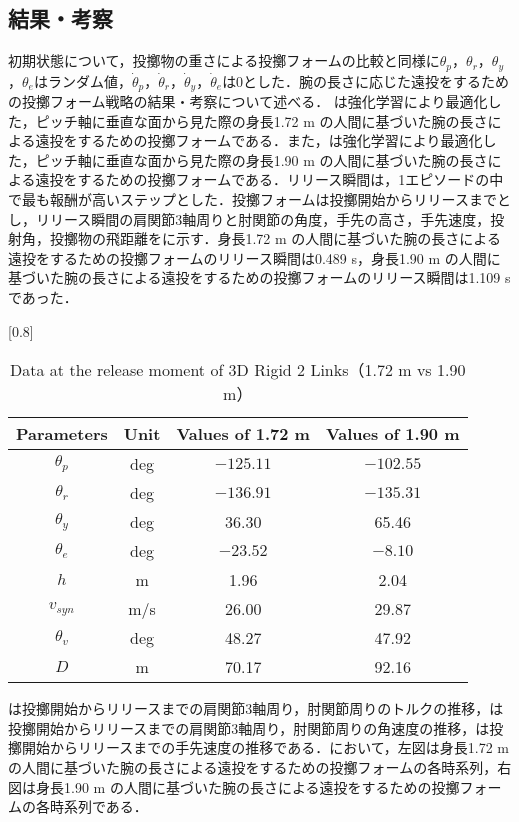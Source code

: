 \begin{small}
\subsection{結果・考察}
初期状態について，投擲物の重さによる投擲フォームの比較と同様に$\theta_{p}$，$\theta_{r}$，$\theta_{y}$，$\theta_{e}$はランダム値，$\dot{\theta}_{p}$，$\dot{\theta}_{r}$，$\dot{\theta}_{y}$，$\dot{\theta}_{e}$は0とした．腕の長さに応じた遠投をするための投擲フォーム戦略の結果・考察について述べる．
は強化学習により最適化した，ピッチ軸に垂直な面から見た際の身長1.72 m の人間に基づいた腕の長さによる遠投をするための投擲フォームである．また，は強化学習により最適化した，ピッチ軸に垂直な面から見た際の身長1.90 m の人間に基づいた腕の長さによる遠投をするための投擲フォームである．リリース瞬間は，1エピソードの中で最も報酬が高いステップとした．投擲フォームは投擲開始からリリースまでとし，リリース瞬間の肩関節3軸周りと肘関節の角度，手先の高さ，手先速度，投射角，投擲物の飛距離をに示す．身長1.72 m の人間に基づいた腕の長さによる遠投をするための投擲フォームのリリース瞬間は0.489 s，身長1.90 m の人間に基づいた腕の長さによる遠投をするための投擲フォームのリリース瞬間は1.109 sであった．
\begin{table}[tb]
  \begin{center}
    \caption{Data at the release moment of 3D Rigid 2 Links（1.72 m vs 1.90 m）}
    \scalebox{0.8}[0.8]{
    \begin{tabular}{c|c|c|c}
      \hline
      Parameters & Unit & Values of 1.72 m & Values of 1.90 m \\
      \hline
      $\theta_{p}$ & deg & $-125.11$ & $-102.55$ \\
      $\theta_{r}$ & deg & $-136.91$ & $-135.31$ \\
      $\theta_{y}$ & deg  & 36.30 & 65.46 \\
      $\theta_{e}$ & deg & $-23.52$ & $-8.10$ \\
      $h$ & m & 1.96 & 2.04 \\
      $v_{syn}$ & m/s & 26.00 & 29.87 \\
      $\theta_{v}$ & deg & 48.27 & 47.92 \\
      $D$ & m & 70.17 & 92.16 \\
      \hline
    \end{tabular}
    }
  \end{center}
\end{table}
は投擲開始からリリースまでの肩関節3軸周り，肘関節周りのトルクの推移，は投擲開始からリリースまでの肩関節3軸周り，肘関節周りの角速度の推移，は投擲開始からリリースまでの手先速度の推移である．において，左図は身長1.72 m の人間に基づいた腕の長さによる遠投をするための投擲フォームの各時系列，右図は身長1.90 m の人間に基づいた腕の長さによる遠投をするための投擲フォームの各時系列である．\\

\end{small}
